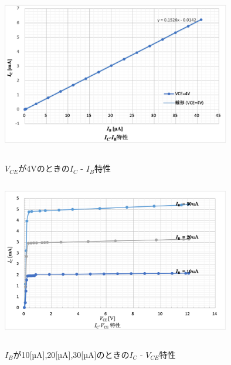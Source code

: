 \documentclass[a4j,10pt,dvipdfmx]{jarticle}
\begin{document}
  \begin{figure}[H]
    \begin{center}
      \label{ic-ib}
    \includegraphics[height=7cm,width=10cm]{v4icib.png}
    \caption{$V_{CE}$が4Vのときの$I_C$ - $I_B$特性}
  \end{center}
  \end{figure}
  \begin{figure}[H]
    \begin{center}
    \label{1030}
    \includegraphics[height=7cm,width=10cm]{icvce1030.png}
    \caption{$I_B$が10[µA],20[µA],30[µA]のときの$I_C$ - $V_{CE}$特性}
  \end{center}
  \end{figure}
\end{document}
